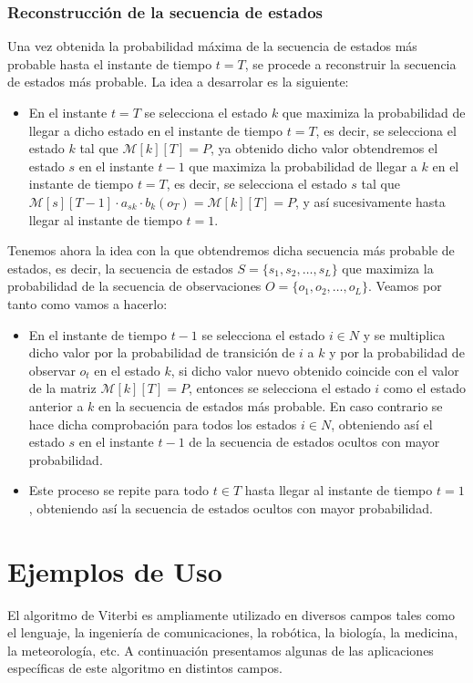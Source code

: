 \documentclass[11pt,openany]{book}
\begin{document}
\subsection{Reconstrucción de la secuencia de estados}
Una vez obtenida la probabilidad máxima de la secuencia de estados más probable hasta el instante de tiempo $t=T$, se procede a reconstruir la secuencia de estados más probable. 
La idea a desarrolar es la siguiente: \\
\begin{itemize}
      \item En el instante $t=T$ se selecciona el estado $k$ que maximiza la probabilidad de llegar a dicho estado en el instante de tiempo $t=T$, es decir,
      se selecciona el estado $k$ tal que $\mathscr{M}[k][T] = P$, ya obtenido dicho valor obtendremos el estado $s$ en el instante $t-1$ que maximiza la probabilidad de llegar a $k$ en el instante
      de tiempo $t=T$, es decir, se selecciona el estado $s$ tal que $\mathscr{M}[s][T-1] \cdot a_{sk} \cdot b_k(o_T) = \mathscr{M}[k][T] = P$, y así sucesivamente hasta llegar al instante de tiempo $t=1$.      
\end{itemize}
Tenemos ahora la idea con la que obtendremos dicha secuencia más probable de estados, es decir, la secuencia de estados $S = \{s_1, s_2, \ldots, s_L\}$ que maximiza la probabilidad de la secuencia de observaciones $O=\{o_1, o_2, \ldots, o_L\}$.
Veamos por tanto como vamos a hacerlo:
\begin{itemize}
      \item En el instante de tiempo $t-1$ se selecciona el estado $i\in N$ y se multiplica dicho valor por la probabilidad de transición de $i$ a $k$ y por la probabilidad de observar $o_t$ en el estado $k$, 
      si dicho valor nuevo obtenido coincide con el valor de la matriz $\mathscr{M}[k][T]=P$, entonces se selecciona el estado $i$ como el estado anterior a $k$ en la secuencia de estados más probable. En caso 
      contrario se hace dicha comprobación para todos los estados $i\in N$, obteniendo así el estado $s$ en el instante $t-1$ de la secuencia de estados ocultos con mayor probabilidad.
      \item Este proceso se repite para todo $t\in T$ hasta llegar al instante de tiempo $t=1$, obteniendo así la secuencia de estados ocultos con mayor probabilidad.
\end{itemize}


\chapter{Ejemplos de Uso}
El algoritmo de Viterbi es ampliamente utilizado en diversos campos tales como 
el lenguaje, la ingeniería de comunicaciones, la robótica, la biología, la medicina,
la meteorología, etc. A continuación presentamos algunas de las aplicaciones específicas
de este algoritmo en distintos campos.
\end{document}
